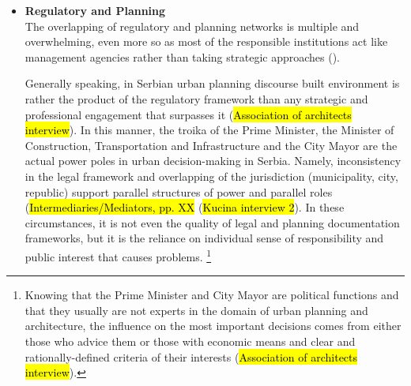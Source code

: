 \documentclass[11pt]{report}
\begin{document}
\begin{itemize}
Similar dependence on global trends and circumstances is obvious in growing involvement of foreign investors and investments funds in the real estate in Serbia. The consequences of political treatment of property and discrepancy between planning and implementation during socialism take its toll being still at play through fast-moving, profit-oriented practices under neoliberalism and transition - once built, the structures are more difficult to change, which has been the logic of BWP\footnote{Despite the double rejection for the building permit from the Ministry of Construction, Transportation and Infrastructure, the coastal fortification was finalized during 2016. It is difficult to estimate, but, having two residential towers under construction nearby, it is very unlikely that the coastal fortification will be dismantled and removed, or even adjusted to the local technical requirements.}
(\hl{Association of architects interview}).
\\

\item \textbf{Regulatory and Planning}
\\
The overlapping of regulatory and planning networks is multiple and overwhelming, even more so as most of the responsible institutions act like management agencies rather than taking strategic approaches (\cite{Vujosevic 2012}).

Generally speaking, in Serbian urban planning discourse built environment is rather the product of the regulatory framework than any strategic and professional engagement that surpasses it (\hl{Association of architects interview}). In this manner, the troika of the Prime Minister, the Minister of Construction, Transportation and Infrastructure and the City Mayor are the actual power poles in urban decision-making in Serbia. Namely, inconsistency in the legal framework and overlapping of the jurisdiction (municipality, city, republic) support parallel structures of power and parallel roles (\hl{Intermediaries/Mediators, pp. XX} (\hl{Kucina interview 2}).
In these circumstances, it is not even the quality of legal and planning documentation frameworks, but it is the reliance on individual sense of responsibility and public interest that causes problems.
\footnote{Knowing that the Prime Minister and City Mayor are political functions and that they usually are not experts in the domain of urban planning and architecture, the influence on the most important decisions comes from either those who advice them or those with economic means and clear and rationally-defined criteria of their interests
(\hl{Association of architects interview}).}


\end{itemize}
\end{document}
